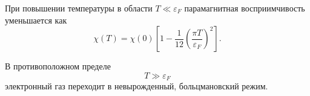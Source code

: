 \documentclass[../final.tex]{subfiles}
\begin{document}
При повышении температуры в области $T\ll\varepsilon_F$
парамагнитная восприимчивость уменьшается как
%
\begin{equation*}
    \chi(T)
    =
    \chi(0)
    \left[
        1
        -
        \frac{1}{12}
        \left(
            \frac{\pi T}{\varepsilon_F}
        \right)^2
    \right].
\end{equation*}

В противоположном пределе
%
\begin{equation*}
    T
    \gg
    \varepsilon_F
\end{equation*}
%
электронный газ переходит в невырожденный, больцмановский режим.
\end{document}
